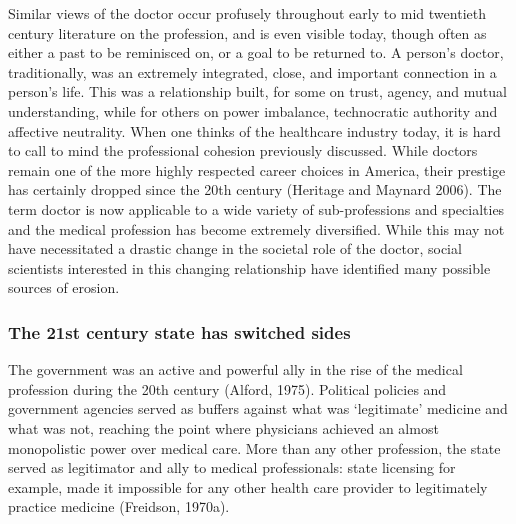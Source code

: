 \documentclass[12pt,twoside]{reedthesis}
\begin{document}
  Similar views of the doctor occur profusely throughout early to mid
  twentieth century literature on the profession, and is even visible
  today, though often as either a past to be reminisced on, or a goal to
  be returned to. A person's doctor, traditionally, was an extremely
  integrated, close, and important connection in a person's life. This was
  a relationship built, for some on trust, agency, and mutual
  understanding, while for others on power imbalance, technocratic
  authority and affective neutrality. When one thinks of the healthcare
  industry today, it is hard to call to mind the professional cohesion
  previously discussed. While doctors remain one of the more highly
  respected career choices in America, their prestige has certainly
  dropped since the 20th century (Heritage and Maynard 2006). The term
  doctor is now applicable to a wide variety of sub-professions and
  specialties and the medical profession has become extremely diversified.
  While this may not have necessitated a drastic change in the societal
  role of the doctor, social scientists interested in this changing
  relationship have identified many possible sources of erosion.
  
  \subsubsection*{The 21st century state has switched
  sides}\label{the-21st-century-state-has-switched-sides}
  
  \begin{Shaded}
  \begin{Highlighting}[]
  \end{Highlighting}
  \end{Shaded}
  
  The government was an active and powerful ally in the rise of the
  medical profession during the 20th century (Alford, 1975). Political
  policies and government agencies served as buffers against what was
  `legitimate' medicine and what was not, reaching the point where
  physicians achieved an almost monopolistic power over medical care. More
  than any other profession, the state served as legitimator and ally to
  medical professionals: state licensing for example, made it impossible
  for any other health care provider to legitimately practice medicine
  (Freidson, 1970a).
  
\end{document}
